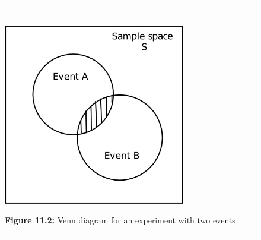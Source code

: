     \setcounter{subfigure}{0}


	\begin{figure}[H] %
    \begin{center}
    \rule[.1in]{\figurerulewidth}{.005in} \\
        \label{m39377*uid1211!!!underscore!!!media}\label{m39377*uid1211!!!underscore!!!printimage}\includegraphics[width=300px]{col11306.imgs/m39377_venn1.png} %
        
      \vspace{2pt}
    \vspace{\rubberspace}\par \begin{cnxcaption}
	  \small \textbf{Figure 11.2: }Venn diagram for an experiment with two events
	\end{cnxcaption}
      
    \vspace{.1in}
    \rule[.1in]{\figurerulewidth}{.005in} \\
        
    \end{center}

 \end{figure}   

    \addtocounter{footnote}{-0}
    

    \setcounter{subfigure}{0}


